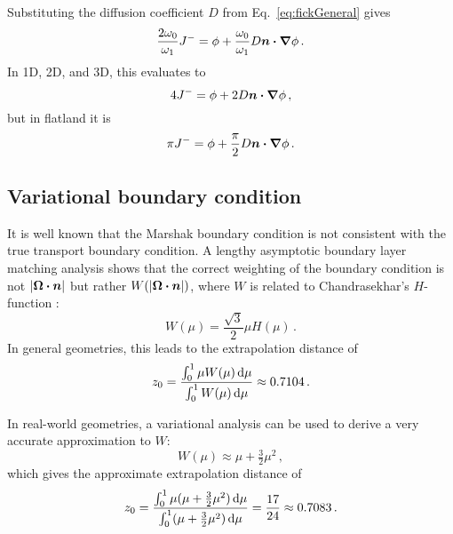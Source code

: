 Substituting the diffusion coefficient $D$ from Eq.~\eqref{eq:fickGeneral} gives
\begin{equation*}
\frac{2\omega_0}{\omega_1} J^{-}
= \phi + \frac{\omega_0}{\omega_1} D \bm{n} \bm{\cdot} \bm{\nabla} \phi\,.
\end{equation*}
In 1D, 2D, and 3D, this evaluates to
\begin{equation*}
4 J^{-}
= \phi + 2 D \bm{n} \bm{\cdot} \bm{\nabla} \phi\,,
\end{equation*}
but in flatland it is
\begin{equation*}
\pi J^{-}
= \phi + \frac{\pi}{2} D \bm{n} \bm{\cdot} \bm{\nabla} \phi\,.
\end{equation*}

\subsection{Variational boundary condition} \label{sec:varBndy}
It is well known that the Marshak boundary condition is not consistent with the
true transport boundary condition. A lengthy asymptotic boundary layer
matching analysis \cite{Hab1975} shows that the correct weighting of the
boundary condition is not $\left| \bm{\Omega}\bm{\cdot}\bm{n} \right|$ but rather
$W(\left| \bm{\Omega}\bm{\cdot}\bm{n} \right|)$, where $W$ is related to Chandrasekhar's
$H$-function \cite{Cha1960}:
\begin{equation} \label{eq:chandraW}
  W(\mu) = \frac{\sqrt{3}}{2} \mu H(\mu) \,.
\end{equation}
In general geometries, this leads to the extrapolation distance of
\begin{align*}
  z_0 = \frac{\int_{0}^{1} \mu W(\mu) \mathop{}\!\mathrm{d} \mu}{\int_{0}^{1} W(\mu) \mathop{}\!\mathrm{d}
  \mu} \approx 0.7104\,.
\end{align*}

In real-world geometries, a variational analysis \cite{Mal1991} can be used to
derive a very accurate approximation to $W$:
\begin{equation*}
W(\mu) \approx \mu + \tfrac{3}{2} \mu^2 \,,
\end{equation*}
which gives the approximate extrapolation distance of
\begin{equation*}
  z_0 = \frac{\int_{0}^{1} \mu (\mu + \tfrac{3}{2} \mu^2 ) \mathop{}\!\mathrm{d}
  \mu}{\int_{0}^{1} (\mu + \tfrac{3}{2} \mu^2 ) \mathop{}\!\mathrm{d} \mu} 
  = \frac{17}{24} \approx 0.7083 \,.
\end{equation*}

